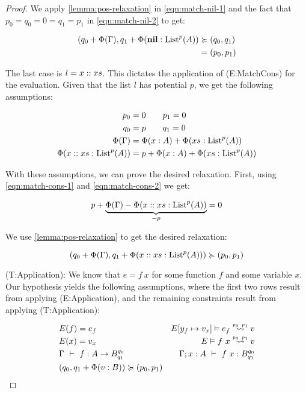 \begin{proof}
   We apply \cref{lemma:pos-relaxation} in \cref{eqn:match-nil-1} and the fact that \(p_0 = q_0 = 0 = q_1 = p_1\) in \cref{eqn:match-nil-2} to get: 
   
   \begin{align}
      (q_0 + \Phi(\Gamma), q_1 + \Phi(\listnil : \ralist{p}{A})   &\relaxation (q_0, q_1) \label{eqn:match-nil-1}\\
                                                                  &= (p_0, p_1) \label{eqn:match-nil-2}
   \end{align}

   The last case is \(l = x :: xs\). This dictates the application of (E:MatchCons) for the evaluation. Given that the list \(l\) has potential \(p\), we get the following assumptions:

   \begin{align}
      p_0            &= 0 \qquad p_1 = 0\nonumber\\
      q_0            &= p \qquad q_1 = 0\nonumber\\
      \Phi(\Gamma)   &= \Phi(x : A) + \Phi(xs : \ralist{p}{A})\label{eqn:match-cons-1}\\
      \Phi(\cons{x}{xs} : \ralist{p}{A}) &= p + \Phi(x : A) + \Phi(xs : \ralist{p}{A})\label{eqn:match-cons-2}
   \end{align}

   With these assumptions, we can prove the desired relaxation. First, using \cref{eqn:match-cons-1} and \cref{eqn:match-cons-2} we get:

   \begin{align}
      p + \underbrace{\Phi(\Gamma) - \Phi(x :: xs : \text{List}^{p}(A))}_{-p} = 0
   \end{align}

   We use \cref{lemma:pos-relaxation} to get the desired relaxation:

   \[
      (q_0 + \Phi(\Gamma), q_1 + \Phi(x :: xs : \text{List}^{p}(A))) \succcurlyeq (p_0, p_1)
   \]

   (T:Application): We know that \(e = f~x\) for some function \(f\) and some variable \(x\). Our hypothesis yields the following assumptions, where the first two rows result from applying (E:Application), and the remaining constraints result from applying (T:Application):

   \begin{align}
      &E(f) = e_f                                      &\evals{\envaugment{E}{y_f}{v_x}}{e_f}{v}{p_0}{p_1} \nonumber\\
      &E(x) = v_x                                      &\evals{E}{f~x}{v}{p_0}{p_1} \nonumber\\
      &\typing{\Gamma}{f}{A \to \ratype{B}{q_0}{q_1}}  &\typing{\Gamma;x : A}{f~x}{\ratype{B}{q_0}{q_1}} \nonumber \\
      &(q_0, q_1 + \Phi(v : B)) \relaxation (p_0, p_1)
   \end{align}


\end{proof}
